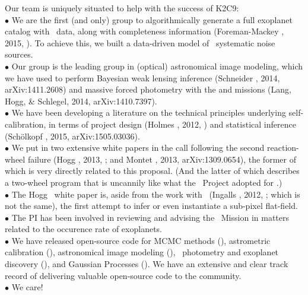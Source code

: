 \documentclass[12pt,preprint]{aastex}
\begin{document}
Our team is uniquely situated to help with the success of K2C9:\\
$\bullet$ We are the first (and only) group to algorithmically
generate a full exoplanet catalog with \ktwo\ data, along with
completeness information (Foreman-Mackey \etal, 2015, \opcit).
To achieve this, we built a data-driven model of \ktwo\ systematic
noise sources.\\
$\bullet$ Our group is the leading group in (optical) astronomical
image modeling, which we have used to perform Bayesian weak lensing
inference (Schneider \etal, 2014, arXiv:1411.2608) and
massive forced photometry with the  and 
missions (Lang, Hogg, \& Schlegel, 2014,
arXiv:1410.7397).\\
$\bullet$ We have been developing a literature on the technical
principles underlying self-calibration, in terms of project design
(Holmes \etal, 2012, \opcit) and statistical inference
(Sch\"olkopf \etal, 2015, arXiv:1505.03036).\\
$\bullet$ We put in two extensive white papers in the call following
the second reaction-wheel failure (Hogg \etal, 2013, \opcit; and
Montet \etal, 2013, arXiv:1309.0654), the former of which is very directly
related to this proposal.
(And the latter of which describes a two-wheel program that is uncannily
like what the \kepler\ Project adopted for \ktwo.)\\
$\bullet$ The Hogg \etal\ white paper is, aside from the work with
\spitzer\ (Ingalls \etal, 2012, \opcit; which is not the same), the first attempt
to infer or even instantiate a sub-pixel flat-field.\\
$\bullet$ The PI has
been involved in reviewing and advising the \kepler\ Mission
in matters related to the occurence rate of exoplanets.\\
$\bullet$ We have released open-source code for MCMC methods
(), astrometric calibration (),
astronomical image modeling (), \ktwo\ photometry
and exoplanet discovery (), and Gaussian Processes
().  We have an extensive and clear track record of
delivering valuable open-source code to the community.\\
$\bullet$ We care!
\end{document}
